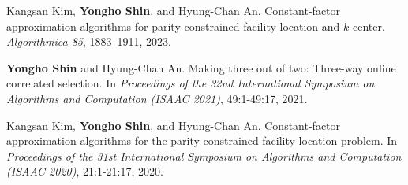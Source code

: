 \documentclass{article}
\newcommand{\killinitspace}{-0.7em}
\begin{document}
Kangsan Kim, \textbf{Yongho Shin}, and Hyung-Chan An. Constant-factor approximation algorithms for parity-constrained facility location and $k$-center. \emph{Algorithmica 85}, 1883–1911, 2023.

\textbf{Yongho Shin} and Hyung-Chan An. Making three out of two: Three-way online correlated selection. In \emph{Proceedings of the 32nd International Symposium on Algorithms and Computation (ISAAC 2021)}, 49:1-49:17, 2021.

Kangsan Kim, \textbf{Yongho Shin}, and Hyung-Chan An. Constant-factor approximation algorithms for the parity-constrained facility location problem. In \emph{Proceedings of the 31st International Symposium on Algorithms and Computation (ISAAC 2020)}, 21:1-21:17, 2020.
\end{document}
